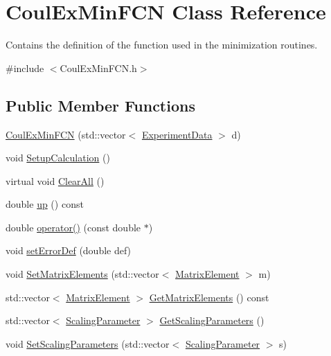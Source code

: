 \hypertarget{classCoulExMinFCN}{\section{Coul\-Ex\-Min\-F\-C\-N Class Reference}
\label{classCoulExMinFCN}
}


Contains the definition of the function used in the minimization routines.  




{\ttfamily \#include $<$Coul\-Ex\-Min\-F\-C\-N.\-h$>$}

\subsection*{Public Member Functions}
\begin{DoxyCompactItemize}
\item 
\hyperlink{classCoulExMinFCN_adbe1821d52bea6bdc1ec188958fe3e72}{Coul\-Ex\-Min\-F\-C\-N} (std\-::vector$<$ \hyperlink{classExperimentData}{Experiment\-Data} $>$ d)
\item 
void \hyperlink{classCoulExMinFCN_a89b319adcf1dcc2d24f402b4dd7c340a}{Setup\-Calculation} ()
\item 
virtual void \hyperlink{classCoulExMinFCN_a5d8e5649a07ab34af3dfe6919ae23a45}{Clear\-All} ()
\item 
double \hyperlink{classCoulExMinFCN_aa55363166ec08dde3977a6f68fe9c000}{up} () const 
\item 
double \hyperlink{classCoulExMinFCN_a86c9ca39401046b83ec30d1d9e1fd013}{operator()} (const double $\ast$)
\item 
void \hyperlink{classCoulExMinFCN_a31d1efece8245aa8c5f7d826be724afe}{set\-Error\-Def} (double def)
\item 
void \hyperlink{classCoulExMinFCN_ac50ca91030a19d63c9476eee772b6a65}{Set\-Matrix\-Elements} (std\-::vector$<$ \hyperlink{classMatrixElement}{Matrix\-Element} $>$ m)
\item 
std\-::vector$<$ \hyperlink{classMatrixElement}{Matrix\-Element} $>$ \hyperlink{classCoulExMinFCN_aabad065c936dcadcdb5b6feeec1b2513}{Get\-Matrix\-Elements} () const 
\item 
std\-::vector$<$ \hyperlink{classScalingParameter}{Scaling\-Parameter} $>$ \hyperlink{classCoulExMinFCN_a98793547bdd277351be2650415b0f19a}{Get\-Scaling\-Parameters} ()
\item 
void \hyperlink{classCoulExMinFCN_a0085795bcbab406044b01571a92ef512}{Set\-Scaling\-Parameters} (std\-::vector$<$ \hyperlink{classScalingParameter}{Scaling\-Parameter} $>$ s)

\end{DoxyCompactItemize}
